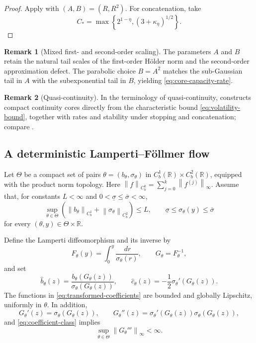 \documentclass[11pt,reqno]{amsart}
\theoremstyle{plain}
\theoremstyle{definition}
\newtheorem{remark}[remark]{Remark}
\newcommand{\R}{\mathbb R}
\newcommand{\dd}{\,d}
\newcommand{\norm}[1]{\left\lVert #1\right\rVert}
\begin{document}
\begin{proof}
Apply  with \((A,B)=(R,R^2)\).  For concatenation,
take
\[
  C_*=\max\left\{2^{1-\eta},(3+\kappa_\eta)^{1/2}\right\}.
\]
\end{proof}

\begin{remark}[Mixed first- and second-order scaling]
The parameters \(A\) and \(B\) retain the natural tail scales of the
first-order H\"older norm and the second-order approximation defect.  The
parabolic choice \(B=A^2\) matches the sub-Gaussian tail in \(A\) with the
subexponential tail in \(B\), yielding \eqref{eq:core-capacity-rate}.
\end{remark}

\begin{remark}[Quasi-continuity]
In the terminology of quasi-continuity,  constructs
compact continuity cores directly from the characteristic bound
\eqref{eq:volatility-bound}, together with rates and stability under stopping
and concatenation; compare \cite{DenisHuPeng11}.
\end{remark}

\subsection{A deterministic Lamperti--F\"ollmer flow}

Let \(\Theta\) be a compact set of pairs
\(\theta=(b_\theta,\sigma_\theta)\) in
\(C_b^1(\R)\times C_b^2(\R)\), equipped with the product norm topology.
Here
\(\norm{f}_{C_b^k}=\sum_{j=0}^k\norm{f^{(j)}}_\infty\).
Assume that, for constants \(L<\infty\) and
\(0<\underline\sigma\le\overline\sigma<\infty\),
\begin{equation}\label{eq:coefficient-class}
  \sup_{\theta\in\Theta}
  \left(
    \norm{b_\theta}_{C_b^1}
    +\norm{\sigma_\theta}_{C_b^2}
  \right)
  \le L,
  \qquad
  \underline\sigma
  \le\sigma_\theta(y)\le\overline\sigma
\end{equation}
for every \((\theta,y)\in\Theta\times\R\).

Define the Lamperti diffeomorphism and its inverse by
\begin{equation}\label{eq:Lamperti}
  F_\theta(y)=\int_0^y\frac{\dd r}{\sigma_\theta(r)},
  \qquad
  G_\theta=F_\theta^{-1},
\end{equation}
and set
\begin{equation}\label{eq:transformed-coefficients}
  \widehat b_\theta(z)
  =\frac{b_\theta(G_\theta(z))}
         {\sigma_\theta(G_\theta(z))},
  \qquad
  \widehat c_\theta(z)
  =-\frac12\sigma_\theta'(G_\theta(z)).
\end{equation}
The functions in \eqref{eq:transformed-coefficients} are bounded and
globally Lipschitz, uniformly in \(\theta\).  In addition,
\[
  G_\theta'(z)=\sigma_\theta(G_\theta(z)),\qquad
  G_\theta''(z)
  =\sigma_\theta'(G_\theta(z))\sigma_\theta(G_\theta(z)),
\]
and \eqref{eq:coefficient-class} implies
\begin{equation}\label{eq:G-third-bound}
  \sup_{\theta\in\Theta}\norm{G_\theta'''}_\infty<\infty .
\end{equation}
\end{document}
